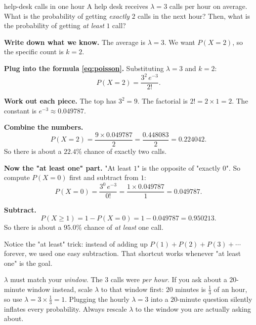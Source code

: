 \documentclass[a4paper,11pt]{article}
\newenvironment{workedbox}[1]{\begin{worked}{#1}}{\end{worked}}
\newenvironment{watchoutbox}{\begin{watchout}}{\end{watchout}}
\begin{document}
\begin{workedbox}{help-desk calls in one hour}
A help desk receives $\lambda = 3$ calls per hour on average. What is the
probability of getting \emph{exactly} $2$ calls in the next hour? Then, what is
the probability of getting \emph{at least} $1$ call?
\begin{steps}
  \item \textbf{Write down what we know.} The average is $\lambda = 3$. We want
        $P(X = 2)$, so the specific count is $k = 2$.
  \item \textbf{Plug into the formula \eqref{eq:poisson}.} Substituting
        $\lambda = 3$ and $k = 2$:
        \[
          P(X = 2) = \frac{3^{2}\, e^{-3}}{2!}.
        \]
  \item \textbf{Work out each piece.} The top has $3^{2} = 9$. The factorial is
        $2! = 2 \times 1 = 2$. The constant is $e^{-3} \approx 0.049787$.
  \item \textbf{Combine the numbers.}
        \[
          P(X = 2)
          = \frac{9 \times 0.049787}{2}
          = \frac{0.448083}{2}
          = 0.224042.
        \]
        So there is about a $\mathbf{22.4\%}$ chance of exactly two calls.
  \item \textbf{Now the "at least one" part.} "At least $1$" is the opposite of
        "exactly $0$". So compute $P(X = 0)$ first and subtract from $1$:
        \[
          P(X = 0) = \frac{3^{0}\, e^{-3}}{0!}
                   = \frac{1 \times 0.049787}{1}
                   = 0.049787.
        \]
  \item \textbf{Subtract.}
        \[
          P(X \ge 1) = 1 - P(X = 0)
                     = 1 - 0.049787
                     = 0.950213.
        \]
        So there is about a $\mathbf{95.0\%}$ chance of \emph{at least} one call.
\end{steps}
Notice the "at least" trick: instead of adding up $P(1) + P(2) + P(3) + \cdots$
forever, we used one easy subtraction. That shortcut works whenever "at least
one" is the goal.
\end{workedbox}

\begin{watchoutbox}
$\lambda$ must match your \emph{window}. The $3$ calls were \emph{per hour}. If
you ask about a $20$-minute window instead, scale $\lambda$ to that window
first: $20$ minutes is $\tfrac{1}{3}$ of an hour, so use $\lambda = 3 \times
\tfrac{1}{3} = 1$. Plugging the hourly $\lambda = 3$ into a $20$-minute question
silently inflates every probability. Always rescale $\lambda$ to the window you
are actually asking about.
\end{watchoutbox}
\end{document}
